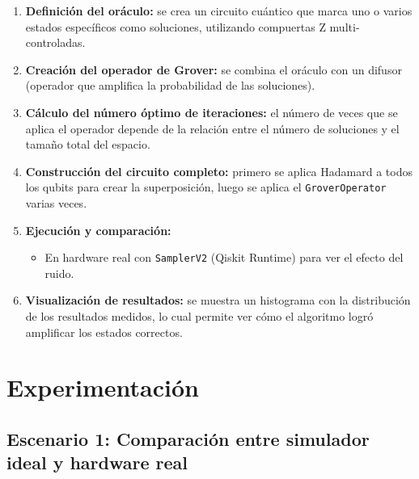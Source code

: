\documentclass{article}
\begin{document}
\begin{enumerate}
    \item \textbf{Definición del oráculo:} se crea un circuito cuántico que marca uno o 
    varios estados específicos como soluciones, utilizando compuertas Z multi-controladas.

    \item \textbf{Creación del operador de Grover:} se combina el oráculo con un difusor 
    (operador que amplifica la probabilidad de las soluciones).

    \item \textbf{Cálculo del número óptimo de iteraciones:} el número de veces que se aplica 
    el operador depende de la relación entre el número de soluciones y el tamaño total del espacio.

    \item \textbf{Construcción del circuito completo:} primero se aplica Hadamard a todos los 
    qubits para crear la superposición, luego se aplica el \texttt{GroverOperator} varias veces.

    \item \textbf{Ejecución y comparación:}
    \begin{itemize}
        \item En hardware real con \texttt{SamplerV2} (Qiskit Runtime) para ver el efecto del ruido.
    \end{itemize}

    \item \textbf{Visualización de resultados:} se muestra un histograma con la distribución de 
    los resultados medidos, lo cual permite ver cómo el algoritmo logró amplificar los estados 
    correctos.
\end{enumerate}



\section{Experimentación}\label{sec:exp}

\subsection{Escenario 1: Comparación entre simulador ideal y hardware real}
\end{document}

